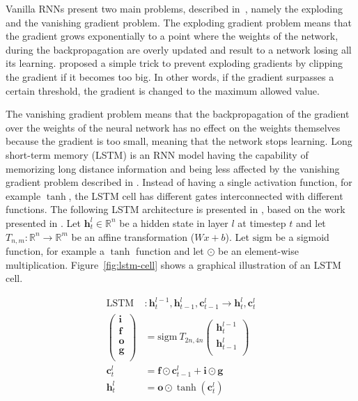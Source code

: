 Vanilla RNNs present two main problems, described in~\citet{bengio1994learning}, namely the exploding and the vanishing gradient problem. The exploding gradient problem means that the gradient grows exponentially to a point where the weights of the network, during the backpropagation \citep{rumelhart1986learning} are overly updated and result to a network losing all its learning. \citet{pascanu2013difficulty} proposed a simple trick to prevent exploding gradients by clipping the gradient if it becomes too big. In other words, if the gradient surpasses a certain threshold, the gradient is changed to the maximum allowed value.

The vanishing gradient problem means that the backpropagation of the gradient over the weights of the neural network has no effect on the weights themselves because the gradient is too small, meaning that the network stops learning.
Long short-term memory (LSTM) \citep{hochreiter1997lstm} is an RNN model having the capability of memorizing long distance information and being less affected by the vanishing gradient problem described in \citet{bengio1994learning}. Instead of having a single activation function, for example $\tanh$, the LSTM cell has different gates interconnected with different functions.
The following LSTM architecture is presented in \citet{1409.2329}, based on the work presented in \citet{1303.5778}. Let $\bm{h}^l_t \in \mathbb{R}^n$ be a hidden state in layer $l$ at timestep $t$ and let $T_{n,m} : \mathbb{R}^n \rightarrow \mathbb{R}^m$ be an affine transformation ($Wx + b$).
Let $\mathrm{sigm}$ be a sigmoid function, for example a $\tanh$ function and let $\odot$ be an element-wise multiplication.
Figure~\ref{fig:lstm-cell} shows a graphical illustration of an LSTM cell.

\begin{align}
    \mathrm{LSTM} &: \bm{h}_t^{l-1}, \bm{h}_{t-1}^l, \bm{c}_{t-1}^l \rightarrow \bm{h}_t^l, \bm{c}_t^l\\
    \begin{pmatrix}
        \bm{i}\\
        \bm{f}\\
        \bm{o}\\
        \bm{g}\\
    \end{pmatrix} &=
    \mathrm{sigm}
    \ T_{2n,4n}
    \begin{pmatrix}
        \bm{h}_t^{l-1}\\
        \bm{h}_{t-1}^l\\
    \end{pmatrix} \label{equ:gates}\\
    \bm{c}_t^l &= \bm{f} \odot \bm{c}_{t-1}^l + \bm{i} \odot \bm{g} \label{equ:lstm-c}\\
    \bm{h}_t^l &= \bm{o} \odot \tanh (\bm{c}_t^l) \label{equ:lstm-h}
\end{align}

